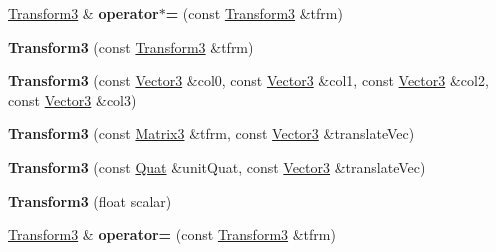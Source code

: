 \begin{DoxyCompactItemize}
\item 
\mbox{\label{classVectormath_1_1Aos_1_1Transform3_a568fa73e656eec4ea319c04ace79b9c2}} 
\hyperlink{classVectormath_1_1Aos_1_1Transform3}{Transform3} \& {\bfseries operator$\ast$=} (const \hyperlink{classVectormath_1_1Aos_1_1Transform3}{Transform3} \&tfrm)
\item 
\mbox{\label{classVectormath_1_1Aos_1_1Transform3_a77ffda55c385ce413eb6f393485cc168}} 
{\bfseries Transform3} (const \hyperlink{classVectormath_1_1Aos_1_1Transform3}{Transform3} \&tfrm)
\item 
\mbox{\label{classVectormath_1_1Aos_1_1Transform3_a43872d7a822d5384e3ee631d035d91be}} 
{\bfseries Transform3} (const \hyperlink{classVectormath_1_1Aos_1_1Vector3}{Vector3} \&col0, const \hyperlink{classVectormath_1_1Aos_1_1Vector3}{Vector3} \&col1, const \hyperlink{classVectormath_1_1Aos_1_1Vector3}{Vector3} \&col2, const \hyperlink{classVectormath_1_1Aos_1_1Vector3}{Vector3} \&col3)
\item 
\mbox{\label{classVectormath_1_1Aos_1_1Transform3_a2c98e657db82e24e18c96a8a08f7cf74}} 
{\bfseries Transform3} (const \hyperlink{classVectormath_1_1Aos_1_1Matrix3}{Matrix3} \&tfrm, const \hyperlink{classVectormath_1_1Aos_1_1Vector3}{Vector3} \&translate\+Vec)
\item 
\mbox{\label{classVectormath_1_1Aos_1_1Transform3_a5a2129a250b2482d68f5c366d9d67b59}} 
{\bfseries Transform3} (const \hyperlink{classVectormath_1_1Aos_1_1Quat}{Quat} \&unit\+Quat, const \hyperlink{classVectormath_1_1Aos_1_1Vector3}{Vector3} \&translate\+Vec)
\item 
\mbox{\label{classVectormath_1_1Aos_1_1Transform3_afa3e8f627015d6c105f49b9cc993d980}} 
{\bfseries Transform3} (float scalar)
\item 
\mbox{\label{classVectormath_1_1Aos_1_1Transform3_af3677e0f88598b1c483d6b6df996d932}} 
\hyperlink{classVectormath_1_1Aos_1_1Transform3}{Transform3} \& {\bfseries operator=} (const \hyperlink{classVectormath_1_1Aos_1_1Transform3}{Transform3} \&tfrm)

\end{DoxyCompactItemize}
